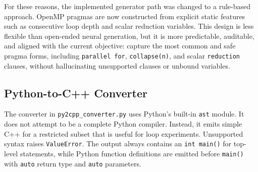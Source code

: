 \documentclass[11pt,a4paper]{article}
\newcommand{\modulepath}[1]{\texttt{#1}}
\begin{document}
For these reasons, the implemented generator path was changed to a rule-based
approach. OpenMP pragmas are now constructed from explicit static features such
as consecutive loop depth and scalar reduction variables. This design is less
flexible than open-ended neural generation, but it is more predictable,
auditable, and aligned with the current objective: capture the most common and
safe pragma forms, including \texttt{parallel for}, \texttt{collapse(n)}, and
scalar \texttt{reduction} clauses, without hallucinating unsupported clauses or
unbound variables.

\subsection{Python-to-C++ Converter}

The converter in \modulepath{py2cpp\_converter.py} uses Python's built-in
\texttt{ast} module. It does not attempt to be a complete Python compiler.
Instead, it emits simple C++ for a restricted subset that is useful for loop
experiments. Unsupported syntax raises \texttt{ValueError}. The output always
contains an \texttt{int main()} for top-level statements, while Python function
definitions are emitted before \texttt{main()} with \texttt{auto} return type
and \texttt{auto} parameters.
\end{document}
